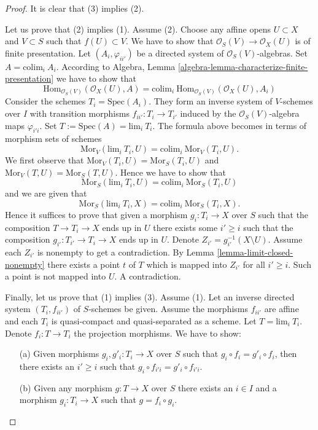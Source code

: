 \begin{proof}
It is clear that (3) implies (2).

\medskip\noindent
Let us prove that (2) implies (1). Assume (2).
Choose any affine opens $U \subset X$ and $V \subset S$ such that
$f(U) \subset V$. We have to show that
$\mathcal{O}_S(V) \to \mathcal{O}_X(U)$ is of finite presentation.
Let $(A_i, \varphi_{ii'})$ be a directed system of
$\mathcal{O}_S(V)$-algebras. Set $A = \text{colim}_i\ A_i$.
According to
Algebra, Lemma \ref{algebra-lemma-characterize-finite-presentation}
we have to show that
$$
\text{Hom}_{\mathcal{O}_S(V)}(\mathcal{O}_X(U), A) =
\text{colim}_i\ \text{Hom}_{\mathcal{O}_S(V)}(\mathcal{O}_X(U), A_i)
$$
Consider the schemes $T_i = \text{Spec}(A_i)$. They
form an inverse system of $V$-schemes over $I$
with transition morphisms $f_{ii'} : T_i \to T_{i'}$
induced by the $\mathcal{O}_S(V)$-algebra maps $\varphi_{i'i}$.
Set $T := \text{Spec}(A) = \text{lim}_i\ T_i$.
The formula above becomes in terms of morphism sets of schemes
$$
\text{Mor}_V(\text{lim}_i\ T_i, U) =
\text{colim}_i\ \text{Mor}_V(T_i, U).
$$
We first observe that
$\text{Mor}_V(T_i, U) = \text{Mor}_S(T_i, U)$
and
$\text{Mor}_V(T, U) = \text{Mor}_S(T, U)$.
Hence we have to show that
$$
\text{Mor}_S(\text{lim}_i\ T_i, U) =
\text{colim}_i\ \text{Mor}_S(T_i, U)
$$
and we are given that
$$
\text{Mor}_S(\text{lim}_i\ T_i, X) =
\text{colim}_i\ \text{Mor}_S(T_i, X).
$$
Hence it suffices to prove that given a morphism $g_i : T_i \to X$ over $S$
such that the composition $T \to T_i \to X$ ends up in $U$ there exists some
$i' \geq i$ such that the composition $g_{i'} : T_{i'} \to T_i \to X$ ends up
in $U$. Denote $Z_{i'} = g_{i'}^{-1}(X \setminus U)$.
Assume each $Z_{i'}$ is nonempty
to get a contradiction. By Lemma \ref{lemma-limit-closed-nonempty}
there exists a point $t$ of $T$ which is mapped into $Z_{i'}$ for all
$i' \geq i$. Such a point is not mapped into $U$. A contradiction.

\medskip\noindent
Finally, let us prove that (1) implies (3). Assume (1). Let an inverse directed
system $(T_i, f_{ii'})$ of $S$-schemes be given. Assume the morphisms $f_{ii'}$
are affine and each $T_i$ is quasi-compact and quasi-separated as a scheme. Let
$T = \text{lim}_i\ T_i$. Denote $f_i : T \to T_i$ the projection morphisms.
We have to show:
\begin{enumerate}
\item[(a)] Given morphisms $g_i, g'_i : T_i \to X$ over $S$ such that
$g_i \circ f_i = g'_i \circ f_i$, then there exists an $i' \geq i$
such that $g_i \circ f_{i'i} = g'_i \circ f_{i'i}$.
\item[(b)] Given any morphism
$g : T \to X$ over $S$ there exists an $i \in I$ and a morphism
$g_i : T_i \to X$ such that $g = f_i \circ g_i$.
\end{enumerate}


\end{proof}
